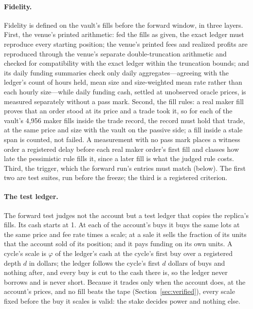 \documentclass[11pt]{article}
\begin{document}
\paragraph{Fidelity.} Fidelity is defined on the vault's fills before the forward window, in three layers. First, the venue's printed arithmetic: fed the fills as given, the exact ledger must reproduce every starting position; the venue's printed fees and realized profits are reproduced through the venue's separate double-truncation arithmetic and checked for compatibility with the exact ledger within the truncation bounds; and its daily funding summaries check only daily aggregates---agreeing with the ledger's count of hours held, mean size and size-weighted mean rate rather than each hourly size---while daily funding cash, settled at unobserved oracle prices, is measured separately without a pass mark. Second, the fill rules: a real maker fill proves that an order stood at its price and a trade took it, so for each of the vault's 4{,}956 maker fills inside the trade record, the record must hold that trade, at the same price and size with the vault on the passive side; a fill inside a stale span is counted, not failed. A measurement with no pass mark places a witness order a registered delay before each real maker order's first fill and classes how late the pessimistic rule fills it, since a later fill is what the judged rule costs. Third, the trigger, which the forward run's entries must match (below). The first two are test suites, run before the freeze; the third is a registered criterion.

\paragraph{The test ledger.} The forward test judges not the account but a test ledger that copies the replica's fills. Its cash starts at 1. At each of the account's buys it buys the same lots at the same price and fee rate times a scale; at a sale it sells the fraction of its units that the account sold of its position; and it pays funding on its own units. A cycle's scale is $\varphi$ of the ledger's cash at the cycle's first buy over a registered depth $d$ in dollars; the ledger follows the cycle's first $d$ dollars of buys and nothing after, and every buy is cut to the cash there is, so the ledger never borrows and is never short. Because it trades only when the account does, at the account's prices, and no fill beats the tape (Section~\ref{sec:verified}), every scale fixed before the buy it scales is valid: the stake decides power and nothing else.
\end{document}
